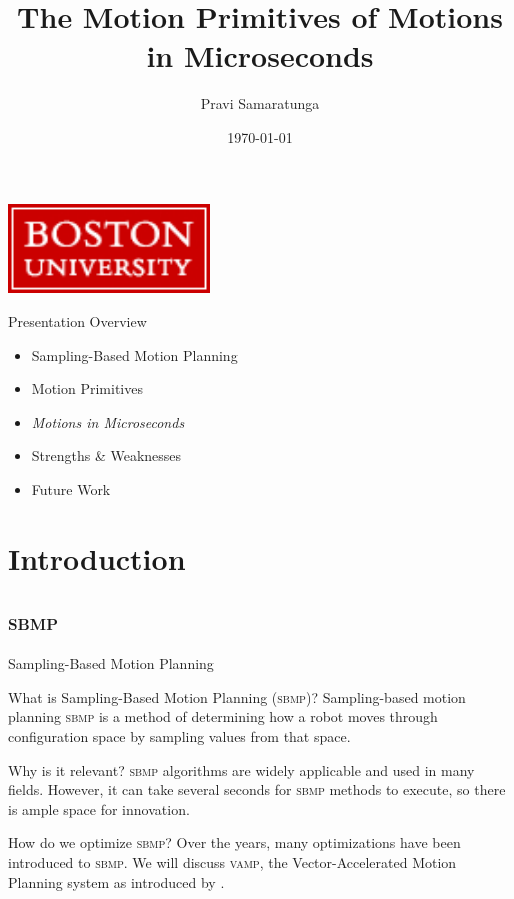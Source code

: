 \documentclass{beamer}
\title[]{The Motion Primitives of Motions in Microseconds}
\author[]{Pravi Samaratunga}
\institute{Boston University ECE}
\date{\today}
\begin{document}
\begin{frame}
   \begin{center}
       \titlepage
     
       \includegraphics[width=0.4\textwidth]{./assets/BU_logo.png}
   \end{center}
\end{frame}

\begin{frame}{Presentation Overview}
\begin{itemize}
\item Sampling-Based Motion Planning \\
\item Motion Primitives \\
\item \textit{Motions in Microseconds} \\
\item Strengths \& Weaknesses\\
\item Future Work \\
\end{itemize}
\end{frame}

\section{Introduction}
\subsection{\textsc{sbmp}}

\begin{frame}{Sampling-Based Motion Planning}

\pause
\begin{block}{What is Sampling-Based Motion Planning (\textsc{sbmp})?}
\pause Sampling-based motion planning \textsc{sbmp} is a method of determining how a robot moves through configuration space by sampling values from that space. %
\end{block}

\pause
\begin{block}{Why is it relevant?} 
\pause \textsc{sbmp} algorithms are widely applicable and used in many fields. %
However, it can take several seconds for \textsc{sbmp} methods to execute, so there is ample space for innovation.
\end{block}

\pause
\begin{block}{How do we optimize \textsc{sbmp}?}
Over the years, many optimizations have been introduced to \textsc{sbmp}. We will discuss \textsc{vamp}, the Vector-Accelerated Motion Planning system as introduced by \cite{paper:MiM}.
\end{block}
\end{frame}
\end{document}
